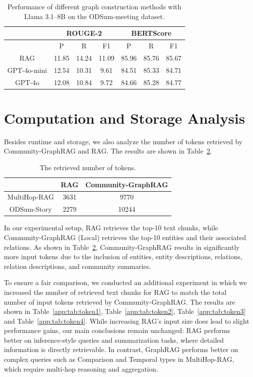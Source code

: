 \begin{table}[!htb]
\centering
\caption{Performance of different graph construction methods with Llama 3.1–8B on the ODSum-meeting dataset.}
\label{app:tab:cons4}
\begin{tabular}{c|ccc|ccc}
\hline
                   & \multicolumn{3}{c|}{ROUGE-2} & \multicolumn{3}{c}{BERTScore} \\ \hline
\multicolumn{1}{l|}{} & P        & R       & F1      & P        & R        & F1      \\ \hline
RAG                   & 11.85    & 14.24   & 11.09   & 85.96    & 85.76    & 85.67   \\
GPT-4o-mini           & 12.54    & 10.31   & 9.61    & 84.51    & 85.33    & 84.71   \\
GPT-4o                & 12.08    & 10.84   & 9.72    & 84.66    & 85.28    & 84.77   \\ \hline
\end{tabular}
\end{table}


\section{Computation and Storage Analysis}
\label{app:sec:time}

Besides runtime and storage, we also analyze the number of tokens retrieved by Community-GraphRAG and RAG. The results are shown in Table~\ref{app:table:token}.

\begin{table}[!htb]
\centering
\caption{The retrieved number of tokens.}
\label{app:table:token}
\begin{tabular}{c|cc}
\hline
             & RAG  & Community-GraphRAG \\ \hline
MultiHop-RAG & 3631 & 9770               \\
ODSum-Story  & 2279 & 10244              \\ \hline
\end{tabular}
\end{table}

In our experimental setup, RAG retrieves the top-10 text chunks, while Community-GraphRAG (Local) retrieves the top-10 entities and their associated relations. As shown in Table~\ref{app:table:token}, Community-GraphRAG results in significantly more input tokens due to the inclusion of entities, entity descriptions, relations, relation descriptions, and community summaries.

To ensure a fair comparison, we conducted an additional experiment in which we increased the number of retrieved text chunks for RAG to match the total number of input tokens retrieved by Community-GraphRAG. The results are shown in Table~\ref{app:tab:token1}, Table~\ref{app:tab:token2}, Table~\ref{app:tab:token3} and Table~\ref{app:tab:token4}. While increasing RAG’s input size does lead to slight performance gains, our main conclusions remain unchanged: RAG performs better on inference-style queries and summarization tasks, where detailed information is directly retrievable. In contrast, GraphRAG performs better on complex queries such as Comparison and Temporal types in MultiHop-RAG, which require multi-hop reasoning and aggregation.


